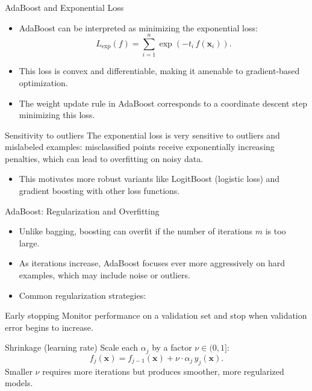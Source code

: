 \begin{frame}{AdaBoost and Exponential Loss}
  \begin{itemize}
    \item AdaBoost can be interpreted as minimizing the \alert{exponential loss}:
          \[
          L_{\text{exp}}(f) = \sum_{i=1}^{n} \exp(-t_i\, f(\mathbf{x}_i)).
          \]
    \item This loss is convex and differentiable, making it amenable to gradient-based
          optimization.
    \item The weight update rule in AdaBoost corresponds to a coordinate descent step
          minimizing this loss.
  \end{itemize}
  \begin{alertblock}{Sensitivity to outliers}
    The exponential loss is very sensitive to outliers and mislabeled examples: misclassified
    points receive exponentially increasing penalties, which can lead to overfitting on noisy data.
  \end{alertblock}
  \begin{itemize}
    \item This motivates more robust variants like LogitBoost (logistic loss) and gradient boosting
          with other loss functions.
  \end{itemize}
\end{frame}

\begin{frame}{AdaBoost: Regularization and Overfitting}
  \begin{itemize}
    \item Unlike bagging, boosting can \alert{overfit} if the number of iterations $m$ is too large.
    \item As iterations increase, AdaBoost focuses ever more aggressively on hard examples,
          which may include noise or outliers.
    \item Common regularization strategies:
  \end{itemize}
  \begin{block}{Early stopping}
    Monitor performance on a validation set and stop when validation error begins to increase.
  \end{block}
  \begin{block}{Shrinkage (learning rate)}
    Scale each $\alpha_j$ by a factor $\nu \in (0, 1]$:
    \[
    f_j(\mathbf{x}) = f_{j-1}(\mathbf{x}) + \nu \cdot \alpha_j\, y_j(\mathbf{x}).
    \]
    Smaller $\nu$ requires more iterations but produces smoother, more regularized models.
  \end{block}
\end{frame}


